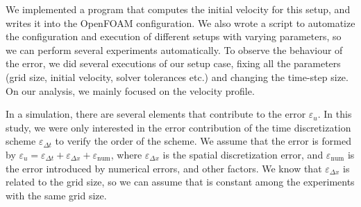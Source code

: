 \documentclass[
  english,        %
  font=times,     %
  onecolumn,      %
]{tumarticle}
\begin{document}
We implemented a program that computes the initial velocity for this setup, and writes it into the OpenFOAM configuration. We also wrote a script to automatize the configuration and execution of different setups with varying parameters, so we can perform several experiments automatically.
To observe the behaviour of the error, we did several executions of our setup case, fixing all the parameters (grid size, initial velocity, solver tolerances etc.) and changing the time-step size. On our analysis, we mainly focused on the velocity profile.

In a simulation, there are several elements that contribute to the error $\varepsilon_{u}$. In this study, we were only interested in the error contribution of the time discretization scheme $\varepsilon_{\Delta t}$ to verify the order of the scheme. We assume that the error is formed by $\varepsilon_u = \varepsilon_{\Delta t} + \varepsilon_{\Delta x} + \varepsilon_\text{num}$, where $\varepsilon_{\Delta x}$ is the spatial discretization error, and $\varepsilon_\text{num}$ is the error introduced by numerical errors, and other factors. We know that $\varepsilon_{\Delta x}$ is related to the grid size, so we can assume that is constant among the experiments with the same grid size.
\end{document}
